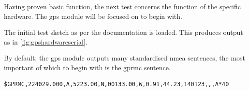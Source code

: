 Having proven basic function, the next test concerns the function of the specific hardware. The \acrshort{gps} module
will be focused on to begin with.

The initial test sketch as per the documentation \cite{adafruit:gps, adafruit:gpshardwareserial} is loaded.
This produces output as in \cref{fig:gpshardwareserial}.

By default, the \acrshort{gps} module outputs many standardised \acrshort{nmea} sentences,
the most important of which to begin with is the \gls{gprmc} sentence.

\begin{lstlisting}[label=code:gprmcsentence, caption={\acrshort{nmea} \gls{gprmc} sentence example},captionpos=b]
$GPRMC,224029.000,A,5223.00,N,00133.00,W,0.91,44.23,140123,,,A*40
\end{lstlisting}


